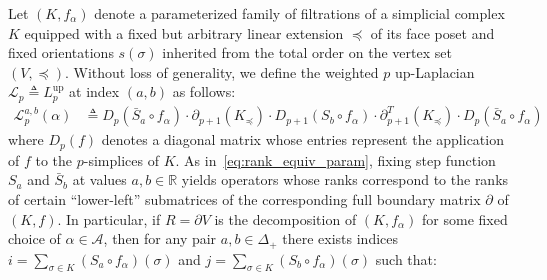 
Let $(K, f_\alpha)$ denote a parameterized family of filtrations of a simplicial complex $K$ equipped with a fixed but arbitrary linear extension $ \preceq$ of its face poset and fixed orientations $s(\sigma)$ inherited from the total order on the vertex set $(V, \preceq)$.
Without loss of generality, we define the weighted $p$ up-Laplacian $\mathcal{L}_p \triangleq  L_p^{\mathrm{up}}$ at index $(a, b)$ as follows: 
\begin{align}\label{eq:laplacian_decouple}
\mathcal{L}_p^{a,b}(\alpha) & \triangleq D_p(\bar{S}_a \circ f_\alpha) \cdot \partial_{p+1}(K_\preceq) \cdot D_{p+1}(S_b \circ f_\alpha) \cdot \partial_{p+1}^T(K_\preceq) \cdot D_p(\bar{S}_a \circ f_\alpha) 
\end{align}
where $D_p(f)$ denotes a diagonal matrix whose entries represent the application of $f$ to the $p$-simplices of $K$.
As in~\eqref{eq:rank_equiv_param}, fixing step function $S_a$ and $\bar{S}_b$ at values $a, b \in \mathbb{R}$ yields operators whose ranks correspond to the ranks of certain ``lower-left'' submatrices of the corresponding full boundary matrix $\partial$ of $(K, f)$. In particular, if $R = \partial V$ is the decomposition of $(K, f_\alpha)$ for some fixed choice of $\alpha \in \mathcal{A}$, then for any pair $a,b\in \Delta_+$ there exists indices $i = \sum_{\sigma \in K} (S_a \circ f_\alpha)(\sigma)$ and $j = \sum_{\sigma \in K} (S_b \circ f_\alpha)(\sigma)$ such that:
